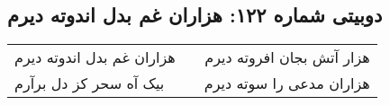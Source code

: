 \begin{center}
\section*{دوبیتی شماره ۱۲۲: هزاران غم بدل اندوته دیرم}
\label{sec:122}
\begin{longtable}{l p{0.5cm} r}
هزاران غم بدل اندوته دیرم
&&
هزار آتش بجان افروته دیرم
\\
بیک آه سحر کز دل برآرم
&&
هزاران مدعی را سوته دیرم
\\
\end{longtable}
\end{center}

